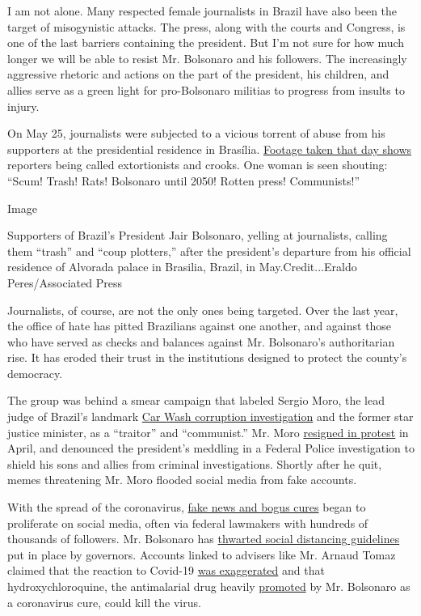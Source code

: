 I am not alone. Many respected female journalists in Brazil have also
been the target of misogynistic attacks. The press, along with the
courts and Congress, is one of the last barriers containing the
president. But I'm not sure for how much longer we will be able to
resist Mr. Bolsonaro and his followers. The increasingly aggressive
rhetoric and actions on the part of the president, his children, and
allies serve as a green light for pro-Bolsonaro militias to progress
from insults to injury.

On May 25, journalists were subjected to a vicious torrent of abuse from
his supporters at the presidential residence in Brasília.
\href{https://twitter.com/folha/status/1264913877399212034}{Footage
taken that day shows} reporters being called extortionists and crooks.
One woman is seen shouting: ``Scum! Trash! Rats! Bolsonaro until 2050!
Rotten press! Communists!''

Image

Supporters of Brazil's President Jair Bolsonaro, yelling at journalists,
calling them ``trash'' and ``coup plotters,'' after the president's
departure from his official residence of Alvorada palace in Brasilia,
Brazil, in May.Credit...Eraldo Peres/Associated Press

Journalists, of course, are not the only ones being targeted. Over the
last year, the office of hate has pitted Brazilians against one another,
and against those who have served as checks and balances against Mr.
Bolsonaro's authoritarian rise. It has eroded their trust in the
institutions designed to protect the county's democracy.

The group was behind a smear campaign that labeled Sergio Moro, the lead
judge of Brazil's landmark
\href{https://www.nytimes3xbfgragh.onion/2017/09/18/opinion/brazil-corruption-car-wash.html?searchResultPosition=1}{Car
Wash corruption investigation} and the former star justice minister, as
a ``traitor'' and ``communist.'' Mr. Moro
\href{https://www.nytimes3xbfgragh.onion/2020/04/24/world/americas/brazil-bolsonaro-moro.html}{resigned
in protest} in April, and denounced the president's meddling in a
Federal Police investigation to shield his sons and allies from criminal
investigations. Shortly after he quit, memes threatening Mr. Moro
flooded social media from fake accounts.

With the spread of the coronavirus,
\href{https://www.bbc.com/news/53361876}{fake news and bogus cures}
began to proliferate on social media, often via federal lawmakers with
hundreds of thousands of followers. Mr. Bolsonaro has
\href{https://www.hrw.org/news/2020/04/10/brazil-bolsonaro-sabotages-anti-covid-19-efforts}{thwarted
social distancing guidelines} put in place by governors. Accounts linked
to advisers like Mr. Arnaud Tomaz claimed that the reaction to Covid-19
\href{https://www.bbc.com/portuguese/brasil-53353594}{was exaggerated}
and that hydroxychloroquine, the antimalarial drug heavily
\href{https://www.nytimes3xbfgragh.onion/2020/06/13/world/americas/virus-brazil-bolsonaro-chloroquine.html}{promoted}
by Mr. Bolsonaro as a coronavirus cure, could kill the virus.

